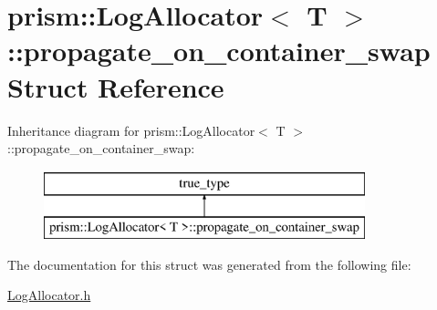 \hypertarget{structprism_1_1_log_allocator_1_1propagate__on__container__swap}{}\section{prism\+:\+:Log\+Allocator$<$ T $>$\+:\+:propagate\+\_\+on\+\_\+container\+\_\+swap Struct Reference}
\label{structprism_1_1_log_allocator_1_1propagate__on__container__swap}
Inheritance diagram for prism\+:\+:Log\+Allocator$<$ T $>$\+:\+:propagate\+\_\+on\+\_\+container\+\_\+swap\+:\begin{figure}[H]
\begin{center}
\leavevmode
\includegraphics[height=2.000000cm]{structprism_1_1_log_allocator_1_1propagate__on__container__swap}
\end{center}
\end{figure}


The documentation for this struct was generated from the following file\+:\begin{DoxyCompactItemize}
\item 
\hyperlink{_log_allocator_8h}{Log\+Allocator.\+h}\end{DoxyCompactItemize}
